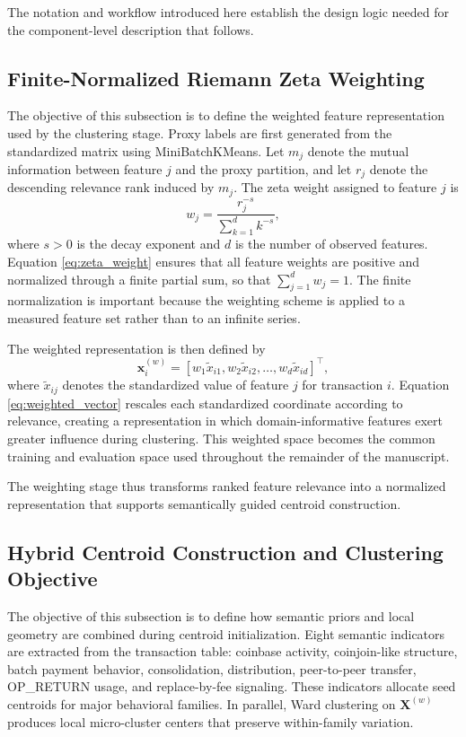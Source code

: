 \documentclass{ieeeaccess}
\begin{document}
The notation and workflow introduced here establish the design logic needed for the component-level description that follows.

\subsection{Finite-Normalized Riemann Zeta Weighting}

The objective of this subsection is to define the weighted feature representation used by the clustering stage. Proxy labels are first generated from the standardized matrix using MiniBatchKMeans. Let $m_j$ denote the mutual information between feature $j$ and the proxy partition, and let $r_j$ denote the descending relevance rank induced by $m_j$. The zeta weight assigned to feature $j$ is
\begin{equation}
w_j = \frac{r_j^{-s}}{\sum_{k=1}^{d} k^{-s}},
\label{eq:zeta_weight}
\end{equation}
where $s > 0$ is the decay exponent and $d$ is the number of observed features. Equation \eqref{eq:zeta_weight} ensures that all feature weights are positive and normalized through a finite partial sum, so that $\sum_{j=1}^{d} w_j = 1$. The finite normalization is important because the weighting scheme is applied to a measured feature set rather than to an infinite series.

The weighted representation is then defined by
\begin{equation}
\mathbf{x}_i^{(w)} = \left[w_1 \tilde{x}_{i1}, w_2 \tilde{x}_{i2}, \ldots, w_d \tilde{x}_{id}\right]^\top,
\label{eq:weighted_vector}
\end{equation}
where $\tilde{x}_{ij}$ denotes the standardized value of feature $j$ for transaction $i$. Equation \eqref{eq:weighted_vector} rescales each standardized coordinate according to relevance, creating a representation in which domain-informative features exert greater influence during clustering. This weighted space becomes the common training and evaluation space used throughout the remainder of the manuscript.

The weighting stage thus transforms ranked feature relevance into a normalized representation that supports semantically guided centroid construction.
\subsection{Hybrid Centroid Construction and Clustering Objective}

The objective of this subsection is to define how semantic priors and local geometry are combined during centroid initialization. Eight semantic indicators are extracted from the transaction table: coinbase activity, coinjoin-like structure, batch payment behavior, consolidation, distribution, peer-to-peer transfer, OP\_RETURN usage, and replace-by-fee signaling. These indicators allocate seed centroids for major behavioral families. In parallel, Ward clustering on $\mathbf{X}^{(w)}$ produces local micro-cluster centers that preserve within-family variation.
\end{document}
